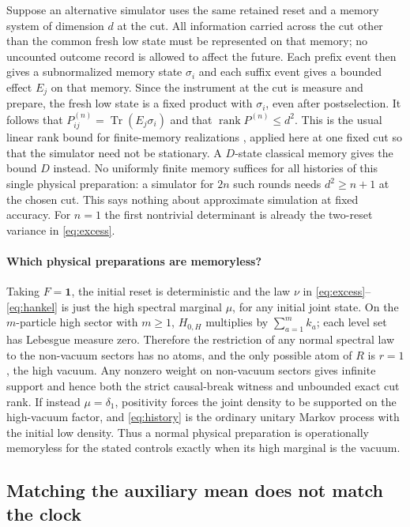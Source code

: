 \documentclass[11pt]{article}
\newcommand{\tr}{\operatorname{Tr}}
\newcommand{\one}{\mathbf 1}
\begin{document}
Suppose an alternative simulator uses the same retained reset and a memory system of dimension \(d\) at the cut. All information carried across the cut other than the common fresh low state must be represented on that memory; no uncounted outcome record is allowed to affect the future. Each prefix event then gives a subnormalized memory state \(\sigma_i\) and each suffix event gives a bounded effect \(E_j\) on that memory. Since the instrument at the cut is measure and prepare, the fresh low state is a fixed product with \(\sigma_i\), even after postselection. It follows that \(P^{(n)}_{ij}=\tr(E_j\sigma_i)\) and that \(\operatorname{rank}P^{(n)}\leq d^2\). This is the usual linear rank bound for finite-memory realizations \cite{Fanizza}, applied here at one fixed cut so that the simulator need not be stationary. A \(D\)-state classical memory gives the bound \(D\) instead. No uniformly finite memory suffices for all histories of this single physical preparation: a simulator for \(2n\) such rounds needs \(d^2\geq n+1\) at the chosen cut. This says nothing about approximate simulation at fixed accuracy. For \(n=1\) the first nontrivial determinant is already the two-reset variance in \eqref{eq:excess}.

\paragraph{Which physical preparations are memoryless?}
Taking \(F=\one\), the initial reset is deterministic and the law \(\nu\) in \eqref{eq:excess}--\eqref{eq:hankel} is just the high spectral marginal \(\mu\), for any initial joint state. On the \(m\)-particle high sector with \(m\geq1\), \(H_{0,H}\) multiplies by \(\sum_{a=1}^m k_a\); each level set has Lebesgue measure zero. Therefore the restriction of any normal spectral law to the non-vacuum sectors has no atoms, and the only possible atom of \(R\) is \(r=1\), the high vacuum. Any nonzero weight on non-vacuum sectors gives infinite support and hence both the strict causal-break witness and unbounded exact cut rank. If instead \(\mu=\delta_1\), positivity forces the joint density to be supported on the high-vacuum factor, and \eqref{eq:history} is the ordinary unitary Markov process with the initial low density. Thus a normal physical preparation is operationally memoryless for the stated controls exactly when its high marginal is the vacuum.

\subsection{Matching the auxiliary mean does not match the clock}
\end{document}
